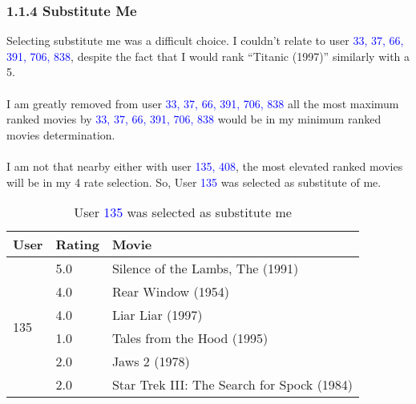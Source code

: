 \clearpage
\subsubsection{1.1.4 Substitute Me}
\vspace{2mm}

Selecting substitute me was a difficult choice. I couldn't relate to user \textcolor{blue}{33, 37, 66, 391, 706, 838}, despite the fact that I would rank \enquote{Titanic (1997)} similarly with a 5.\\
\\
I am greatly removed from user \textcolor{blue}{33, 37, 66, 391, 706, 838} all the most maximum ranked movies by \textcolor{blue}{33, 37, 66, 391, 706, 838} would be in my minimum ranked movies determination.\\
\\
I am not that nearby either with user \textcolor{blue}{135, 408}, the most elevated ranked movies will be in my 4 rate selection. So, User \textcolor{blue}{135} was selected as substitute of me. \\
\vspace{5mm}
\begin{table}[h!]
\centering
\begin{tabular}{| l | l | l |}
\hline
User & Rating & Movie \\
\hline
\multirow{6}{*}{135} & 5.0 & Silence of the Lambs, The (1991) \\
& 4.0 & Rear Window (1954)\\ 
& 4.0 & Liar Liar (1997)\\
& 1.0 & Tales from the Hood (1995)\\ 
 & 2.0 & Jaws 2 (1978)  \\ 
 & 2.0 & Star Trek III: The Search for Spock (1984)\\ \hline
\end{tabular}
\caption{User \textcolor{blue}{135} was selected as substitute me}
\label{tab:substitute}
\end{table}


